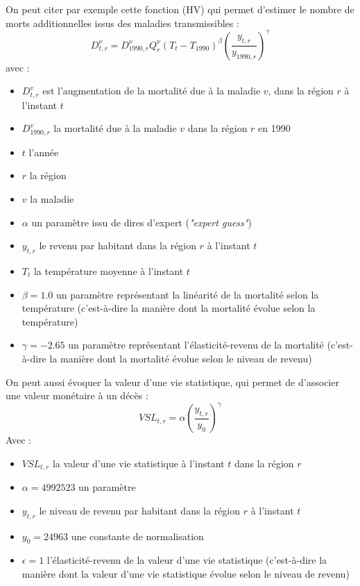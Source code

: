 On peut citer par exemple cette fonction (HV) qui permet d'estimer le nombre de morts additionnelles issus des maladies transmissibles  :  
\begin{equation}
    D_{t,r}^{\nu}=D_{1990,r}^{\nu}Q_{r}^{\nu}\left(T_{t}-T_{1990}\right)^{\beta}\left(\frac{y_{t,r}}{y_{1990,r}}\right)^{\gamma}
    \label{eq:fund_HV}
\end{equation}
avec : 
\begin{itemize}
    \item $D^v_{t,r}$ est l'augmentation de la mortalité due à la maladie $v$, dans la région $r$ à l'instant $t$ 
    \item $D^v_{1990,r}$ la mortalité due à la maladie $v$ dans la région $r$ en 1990
    \item $t$ l'année
    \item $r$ la région
    \item $v$ la maladie
    \item $\alpha$ un paramètre issu de dires d'expert (\emph{"expert guess"})
    \item $y_{t,r}$ le revenu par habitant dans la région $r$ à l'instant $t$ 
    \item $T_t$ la température moyenne à l'instant $t$
    \item $\beta = 1.0$ un paramètre représentant la linéarité de la mortalité selon la température (c'est-à-dire la manière dont la mortalité évolue selon la température)
    \item $\gamma = -2.65$ un paramètre représentant l'élasticité-revenu de la mortalité (c'est-à-dire la manière dont la mortalité évolue selon le niveau de revenu)  
\end{itemize}

On peut aussi évoquer la valeur d'une vie statistique, qui permet de d'associer une valeur monétaire à un décès : 
\begin{equation}
    V S L_{t,r}=\alpha\left(\frac{y_{t,r}}{y_{0}}\right)^{\gamma}
    \label{eq:VSL}
\end{equation}
Avec : 
\begin{itemize}
    \item $VSL_{t,r}$ la valeur d'une vie statistique à l'instant $t$ dans la région $r$
    \item $\alpha = 4992523$ un paramètre
    \item $y_{t,r}$ le niveau de revenu par habitant dans la région $r$ à l'instant $t$ 
    \item $y_0 = 24963$ une constante de normalisation
    \item $\epsilon = 1$ l'élasticité-revenu de la valeur d'une vie statistique (c'est-à-dire la manière dont la valeur d'une vie statistique évolue selon le niveau de revenu)
\end{itemize}

